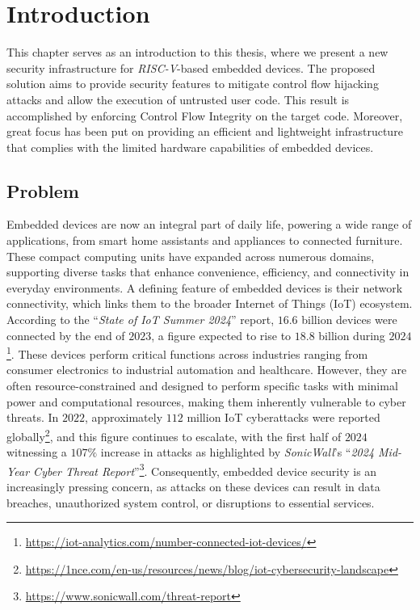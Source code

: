 \chapter{Introduction}
\label{cha:introduction}

This chapter serves as an introduction to this thesis, where we present a new security
infrastructure for \textit{RISC-V}-based embedded devices. The proposed solution
aims to provide security features to mitigate control flow hijacking attacks and
allow the execution of untrusted user code. This result is accomplished by
enforcing Control Flow Integrity on the target code. Moreover, great focus has
been put on providing an efficient and lightweight infrastructure that complies
with the limited hardware capabilities of embedded devices.

\section{Problem}
\label{sec:intro_context}

Embedded devices are now an integral part of daily life, powering a wide range
of applications, from smart home assistants and appliances to connected furniture.
These compact computing units have expanded across numerous domains, supporting diverse
tasks that enhance convenience, efficiency, and connectivity in everyday environments.
A defining feature of embedded devices is their network connectivity, which links
them to the broader Internet of Things (IoT) ecosystem. According to the ``\textit{State
of IoT Summer 2024}'' report, $16.6$ billion devices were connected by the end
of $2023$, a figure expected to rise to $18.8$ billion during $2024$\footnote{\url{https://iot-analytics.com/number-connected-iot-devices/}}.
These devices perform critical functions across industries ranging from consumer
electronics to industrial automation and healthcare. However, they are often resource-constrained
and designed to perform specific tasks with minimal power and computational resources,
making them inherently vulnerable to cyber threats. In $2022$, approximately
$112$ million IoT cyberattacks were reported globally\footnote{\url{https://1nce.com/en-us/resources/news/blog/iot-cybersecurity-landscape}},
and this figure continues to escalate, with the first half of $2024$ witnessing a
$107\%$ increase in attacks as highlighted by \textit{SonicWall}'s ``\textit{2024
Mid-Year Cyber Threat Report}''\footnote{\url{https://www.sonicwall.com/threat-report}}.
Consequently, embedded device security is an increasingly pressing concern, as attacks
on these devices can result in data breaches, unauthorized system control, or disruptions
to essential services.

